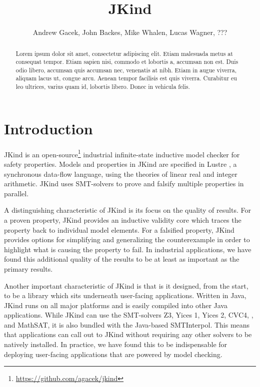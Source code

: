 \documentclass{llncs}
\title{JKind}
\author{Andrew Gacek, John Backes, Mike Whalen, Lucas Wagner, ???}
\newcommand{\jkind}{{\sc JKind}\xspace}
\newcommand{\lustre}{{\sc Lustre}\xspace}
\begin{document}
\maketitle

\begin{abstract}
  Lorem ipsum dolor sit amet, consectetur adipiscing elit. Etiam
  malesuada metus at consequat tempor. Etiam sapien nisi, commodo et
  lobortis a, accumsan non est. Duis odio libero, accumsan quis
  accumsan nec, venenatis at nibh. Etiam in augue viverra, aliquam
  lacus ut, congue arcu. Aenean tempor facilisis est quis viverra.
  Curabitur eu leo ultrices, varius quam id, lobortis libero. Donec in
  vehicula felis.
\end{abstract}

\section{Introduction}

\jkind is an
open-source\footnote{\url{https://github.com/agacek/jkind}} industrial
infinite-state inductive model checker for safety properties. Models
and properties in \jkind are specified in \lustre
\cite{halbwachs1991ieee}, a synchronous data-flow language, using the
theories of linear real and integer arithmetic. \jkind uses
SMT-solvers to prove and falsify multiple properties in parallel.

A distinguishing characteristic of \jkind is its focus on the quality
of results. For a proven property, \jkind provides an inductive
validity core which traces the property back to individual model
elements. For a falsified property, \jkind provides options for
simplifying and generalizing the counterexample in order to highlight
what is causing the property to fail. In industrial applications, we
have found this additional quality of the results to be at least as
important as the primary results.

Another important characteristic of \jkind is that is it designed,
from the start, to be a library which sits underneath user-facing
applications. Written in Java, \jkind runs on all major platforms and
is easily compiled into other Java applications. While \jkind can use
the SMT-solvers {\sc Z3}, {\sc Yices 1}, {\sc Yices 2}, {\sc CVC4}, ,
and {\sc MathSAT}, it is also bundled with the Java-based {\sc
  SMTInterpol}. This means that applications can call out to \jkind
without requiring any other solvers to be natively installed. In
practice, we have found this to be indispensable for deploying
user-facing applications that are powered by model checking.
\end{document}
